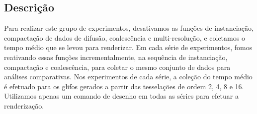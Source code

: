 
\subsection{Descrição}
\label{ssec:exp1_descricao}


Para realizar este grupo de experimentos, desativamos as funções de instanciação, compactação de dados de difusão, coalescência e multi-resolução, e coletamos o tempo médio que se levou para renderizar. Em cada série de experimentos, fomos reativando essas funções incrementalmente, na sequência de instanciação, compactação e coalescência, para coletar o mesmo conjunto de dados para análises comparativas. Nos experimentos de cada série, a coleção do tempo médio é efetuado para os glifos gerados a partir das tesselações de ordem 2, 4, 8 e 16. Utilizamos apenas um comando de desenho em todas as séries para efetuar a renderização.


